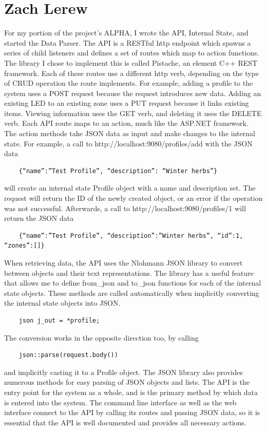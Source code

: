 \documentclass[onecolumn, draftclsnofoot,10pt, compsoc]{IEEEtran}
\begin{document}
	\section{Zach Lerew}
	For my portion of the project’s ALPHA, I wrote the API, Internal State, and started the Data Parser.
	The API is a RESTful http endpoint which spawns a series of child listeners and defines a set of routes which map to action functions.
	The library I chose to implement this is called Pistache, an element C++ REST framework.
	Each of these routes use a different http verb, depending on the type of CRUD operation the route implements.
	For example, adding a profile to the system uses a POST request because the request introduces new data.
	Adding an existing LED to an existing zone uses a PUT request because it links existing items.
	Viewing information uses the GET verb, and deleting it uses the DELETE verb.
	Each API route maps to an action, much like the ASP.NET framework.
	The action methods take JSON data as input and make changes to the internal state.
	For example, a call to http://localhost:9080/profiles/add with the JSON data
	\begin{lstlisting}
	{“name”:”Test Profile”, “description”: “Winter herbs”}
	\end{lstlisting}
	will create an internal state Profile object with a name and description set.
	The request will return the ID of the newly created object, or an error if the operation was not successful.
	Afterwards, a call to http://localhost:9080/profiles/1 will return the JSON data
	\begin{lstlisting}
	{“name”:”Test Profile”, “description”:”Winter herbs”, “id”:1, “zones”:[]}
	\end{lstlisting}
	When retrieving data, the API uses the Nlohmann JSON library to convert between objects and their text representations. The library has a useful feature that allows me to define from\_json and to\_json functions for each of the internal state objects. These methods are called automatically when implicitly converting the internal state objects into JSON.
	\begin{lstlisting}
	json j_out = *profile;
	\end{lstlisting}
	The conversion works in the opposite direction too, by calling
	\begin{lstlisting}
	json::parse(request.body())
	\end{lstlisting}
	and implicitly casting it to a Profile object. The JSON library also provides numerous methods for easy parsing of JSON objects and lists.
	The API is the entry point for the system as a whole, and is the primary method by which data is entered into the system.
	The command line interface as well as the web interface connect to the API by calling its routes and passing JSON data, so it is essential that the API is well documented and provides all necessary actions.
\end{document}

